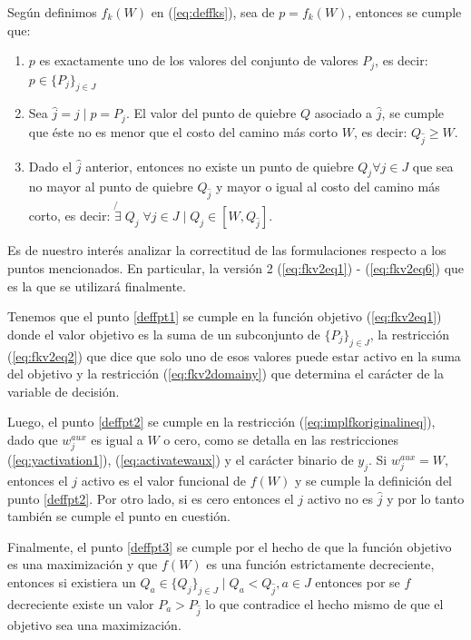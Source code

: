 \documentclass{article}
\begin{document}
  Según definimos $f_k(W)$ en (\ref{eq:deffks}), sea de $p = f_k(W)$, entonces se cumple que:

  \begin{enumerate}
    \item {\label{deffpt1} $p$ es exactamente uno de los valores del conjunto de valores $P_j$, es decir: $p \in \{P_j\}_{j \in J}$}
    \item {\label{deffpt2} Sea $\hat{j} = j \;|\; p = P_j$. El valor del punto de quiebre $Q$ asociado a $\hat{j}$, se cumple que éste no es menor que el costo del camino más corto $W$, es decir: $Q_{\hat{j}} \geq W$.}
    \item {\label{deffpt3} Dado el $\hat{j}$ anterior, entonces no existe un punto de quiebre $Q_j \forall j \in J$ que sea no mayor al punto de quiebre $Q_{\hat{j}}$ y mayor o igual al costo del camino más corto, es decir: $\not{\exists}\; Q_j\; \forall j \in J \;|\; Q_j \in  [W, Q_{\hat{j}}]$}.
  \end{enumerate}

  Es de nuestro interés analizar la correctitud de las formulaciones respecto a los puntos mencionados. En particular, la versión 2 (\ref{eq:fkv2eq1}) - (\ref{eq:fkv2eq6}) que es la que se utilizará finalmente.

  Tenemos que el punto \ref{deffpt1} se cumple en la función objetivo (\ref{eq:fkv2eq1}) donde el valor objetivo es la suma de un subconjunto de $\{P_j\}_{j \in J}$, la restricción (\ref{eq:fkv2eq2}) que dice que solo uno de esos valores puede estar activo en la suma del objetivo y la restricción (\ref{eq:fkv2domainy}) que determina el carácter de la variable de decisión.

  Luego, el punto \ref{deffpt2} se cumple en la restricción (\ref{eq:implfkoriginalineq}), dado que $w^{aux}_j$ es igual a $W$ o cero, como se detalla en las restricciones (\ref{eq:yactivation1}), (\ref{eq:activatewaux}) y el carácter binario de $y_j$. Si $w^{aux}_j = W$, entonces el $j$ activo es el valor funcional de $f(W)$ y se cumple la definición del punto \ref{deffpt2}. Por otro lado, si es cero entonces el $j$ activo no es $\hat{j}$ y por lo tanto también se cumple el punto en cuestión.

  Finalmente, el punto \ref{deffpt3} se cumple por el hecho de que la función objetivo es una maximización y que $f(W)$ es una función estrictamente decreciente, entonces si existiera un $Q_a \in \{Q_j\}_{j \in J} \;|\; Q_a < Q_{\hat{j}}, a \in J$ entonces por se $f$ decreciente existe un valor $P_a > P_{\hat{j}}$ lo que contradice el hecho mismo de que el objetivo sea una maximización.
\end{document}
